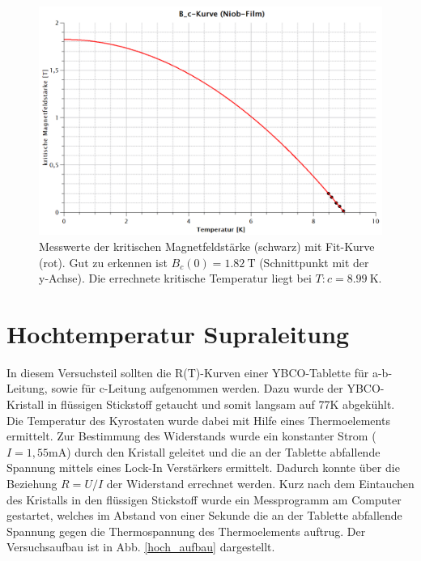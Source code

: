 \begin{figure}[H]
	\begin{center}
		\includegraphics[width=15cm]{B_c_Film.png}
		\caption{Messwerte der kritischen Magnetfeldstärke (schwarz) mit Fit-Kurve (rot). Gut zu erkennen ist $B_{c}(0)=\SI{1,82}{\tesla}$ (Schnittpunkt mit der y-Achse). Die errechnete kritische Temperatur liegt bei $T:{c}=\SI{8,99}{\kelvin}$.}
		\label{B_c_film}
	\end{center}
\end{figure}


\section{Hochtemperatur Supraleitung}
In diesem Versuchsteil sollten die R(T)-Kurven einer YBCO-Tablette für a-b-Leitung, sowie für c-Leitung aufgenommen werden. Dazu wurde der YBCO-Kristall in flüssigen Stickstoff getaucht und somit langsam auf 77K abgekühlt. Die Temperatur des Kyrostaten wurde dabei mit Hilfe eines Thermoelements ermittelt. Zur Bestimmung des Widerstands wurde ein konstanter Strom ($I=1,55$mA) durch den Kristall geleitet und die an der Tablette abfallende Spannung mittels eines Lock-In Verstärkers ermittelt. Dadurch konnte über die Beziehung $R=U/I$ der Widerstand errechnet werden. Kurz nach dem Eintauchen des Kristalls in den flüssigen Stickstoff wurde ein Messprogramm am Computer gestartet, welches im Abstand von einer Sekunde die an der Tablette abfallende Spannung gegen die Thermospannung des Thermoelements auftrug. Der Versuchsaufbau ist in Abb. \ref{hoch_aufbau} dargestellt. 

